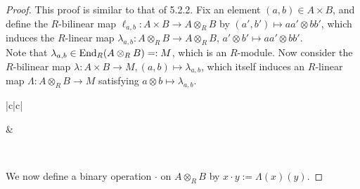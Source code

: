 \documentclass[11pt]{book}
\theoremstyle{definition}   \newtheorem{defn}[counter]{Definition} %
\DeclareMathOperator{\ra}{\rightarrow}   \DeclareMathOperator{\Poly}{\mathbf{P}}   \DeclareMathOperator{\spn}{\textnormal{span}}   \DeclareMathOperator{\aut}{\textnormal{Aut}}
\numberwithin{counter}{chapter}
\begin{document}
\begin{proof}
This proof is similar to that of 5.2.2. Fix an element $(a,b) \in A \times B$, and define the $R$-bilinear map $\ell_{a,b} : A \times B \ra A \otimes_R B$ by $(a',b') \mapsto aa' \otimes bb'$, which induces the $R$-linear map $\lambda_{a,b} : A \otimes_R B \ra A\otimes_R B$, $a' \otimes b' \mapsto aa' \otimes bb'$. \\

Note that $\lambda_{a,b} \in \textnormal{End}_R(A \otimes_R B) =: M$, which is an $R$-module. Now consider the $R$-bilinear map $\lambda : A \times B \ra M, (a,b) \mapsto \lambda_{a,b}$, which itself induces an $R$-linear map $\Lambda : A \otimes_R B \ra M$ satisfying $a \otimes b \mapsto \lambda_{a,b}$. 

\begin{center}
\begin{tabular}{|c|c|}
\hline
{} & 

 \\
\hline 
\end{tabular}
\end{center} 

We now define a binary operation $\cdot$ on $A \otimes_R B$ by $x \cdot y := \Lambda(x)(y)$. 


\end{proof}
\end{document}

